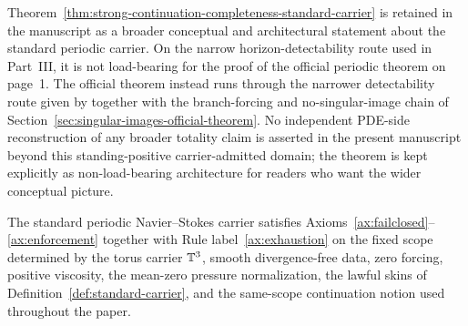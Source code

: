 \begin{remark}
Theorem~\ref{thm:strong-continuation-completeness-standard-carrier} is retained in the manuscript as a broader conceptual and architectural statement about the standard periodic carrier. On the narrow horizon-detectability route used in Part~III, it is not load-bearing for the proof of the official periodic theorem on page~1. The official theorem instead runs through the narrower detectability route given by \HorizonDetectabilityRef{} together with the branch-forcing and no-singular-image chain of Section~\ref{sec:singular-images-official-theorem}. No independent PDE-side reconstruction of any broader totality claim is asserted in the present manuscript beyond this standing-positive carrier-admitted domain; the theorem is kept explicitly as non-load-bearing architecture for readers who want the wider conceptual picture.
\end{remark}

\begin{theorem}
\label{thm:ns-carrier-verifies-rule-package}
The standard periodic Navier--Stokes carrier satisfies Axioms~\ref{ax:failclosed}--\ref{ax:enforcement} together with Rule label~\ref{ax:exhaustion}
on the fixed scope determined by the torus carrier $\mathbb{T}^3$, smooth divergence-free data, zero forcing,
positive viscosity, the mean-zero pressure normalization, the lawful skins of
Definition~\ref{def:standard-carrier}, and the same-scope continuation notion used throughout the paper.
\end{theorem}

